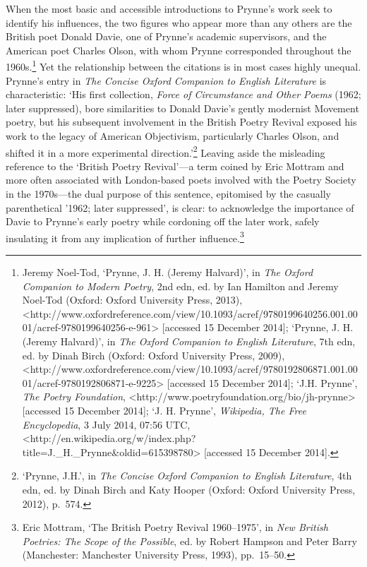 \documentclass[]{article}
\begin{document}
When the most basic and accessible introductions to Prynne's work seek
to identify his influences, the two figures who appear more than any
others are the British poet Donald Davie, one of Prynne's academic
supervisors, and the American poet Charles Olson, with whom Prynne
corresponded throughout the 1960s.\footnote{Jeremy Noel-Tod, `Prynne, J.
  H. (Jeremy Halvard)', in \emph{The Oxford Companion to Modern Poetry},
  2nd edn, ed. by Ian Hamilton and Jeremy Noel-Tod (Oxford: Oxford
  University Press, 2013),
  \textless{}http://www.oxfordreference.com/view/10.1093/acref/9780199640256.001.0001/acref-9780199640256-e-961\textgreater{}
  {[}accessed 15 December 2014{]}; `Prynne, J. H. (Jeremy Halvard)', in
  \emph{The Oxford Companion to English Literature}, 7th edn, ed. by
  Dinah Birch (Oxford: Oxford University Press, 2009),
  \textless{}http://www.oxfordreference.com/view/10.1093/acref/9780192806871.001.0001/acref-9780192806871-e-9225\textgreater{}
  {[}accessed 15 December 2014{]}; `J.H. Prynne', \emph{The Poetry
  Foundation},
  \textless{}http://www.poetryfoundation.org/bio/jh-prynne\textgreater{}
  {[}accessed 15 December 2014{]}; `J. H. Prynne', \emph{Wikipedia, The
  Free Encyclopedia}, 3 July 2014, 07:56 UTC,
  \textless{}http://en.wikipedia.org/w/index.php?title=J.\_H.\_Prynne\&oldid=615398780\textgreater{}
  {[}accessed 15 December 2014{]}.} Yet the relationship between the
citations is in most cases highly unequal. Prynne's entry in \emph{The
Concise Oxford Companion to English Literature} is characteristic: `His
first collection, \emph{Force of Circumstance and Other Poems} (1962;
later suppressed), bore similarities to Donald Davie's gently modernist
Movement poetry, but his subsequent involvement in the British Poetry
Revival exposed his work to the legacy of American Objectivism,
particularly Charles Olson, and shifted it in a more experimental
direction.'\footnote{`Prynne, J.H.', in \emph{The Concise Oxford
  Companion to English Literature}, 4th edn, ed. by Dinah Birch and Katy
  Hooper (Oxford: Oxford University Press, 2012), p.~574.} Leaving aside
the misleading reference to the `British Poetry Revival'---a term coined
by Eric Mottram and more often associated with London-based poets
involved with the Poetry Society in the 1970s---the dual purpose of this
sentence, epitomised by the casually parenthetical '1962; later
suppressed', is clear: to acknowledge the importance of Davie to
Prynne's early poetry while cordoning off the later work, safely
insulating it from any implication of further influence.\footnote{Eric
  Mottram, `The British Poetry Revival 1960--1975', in \emph{New British
  Poetries: The Scope of the Possible}, ed. by Robert Hampson and Peter
  Barry (Manchester: Manchester University Press, 1993), pp.~15--50.}
\end{document}
